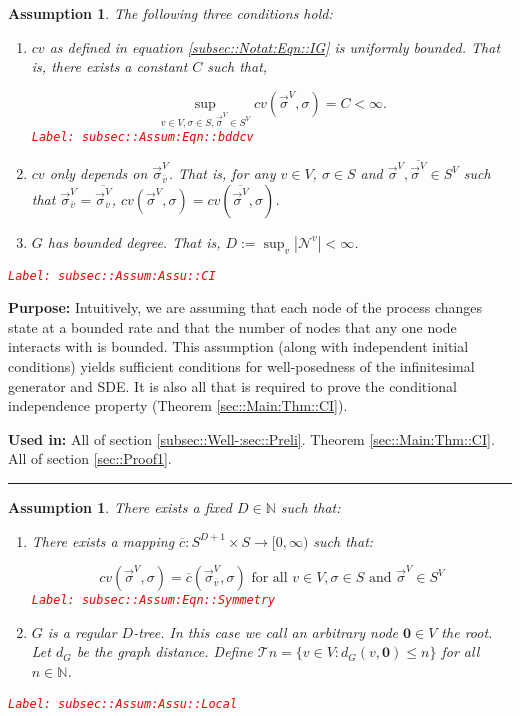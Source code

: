 \documentclass[12pt]{article}
\newcommand{\mb}{\mathbb}
\newcommand{\mc}{\mathcal}
\newcommand{\ra}{\rightarrow}
\newcommand{\ov}{\overline}
\newcommand{\te}{\text}
\newcommand{\tr}{\textcolor{red}}
\newcommand{\labe}[1]{\tr{\texttt{Label: #1}}}
\newcommand{\purpose}{\textbf{Purpose: }}
\newcommand{\usein}{\textbf{Used in: }}
\newcommand{\lin}{\rule{\linewidth}{0.4 pt}}
\newcommand{\defeq}{:=}								%
\renewcommand{\root}{\mathbf{0}}				%
\renewcommand{\v}{v}							%
\renewcommand{\S}{S}							%
\newcommand{\s}{\sigma}							%
\newcommand{\sv}{\vec{\s}}						%
\newcommand{\IGr}{c}							%
\newcommand{\neigh}{\mc{N}}						%
\newcommand{\vind}[1]{^{#1}}					%
\newcommand{\carp}[1]{^{#1}}					%
\newcommand{\vsi}[1]{^{#1}}						%
\newcommand{\cind}[1]{_{#1}}					%
\newcommand{\cl}{\ov}							%
\newcommand{\const}{C}							%
\newcommand{\degr}{D}							%
\newcommand{\IGrg}{\ov{c}}						%
\newcommand{\gdist}{d_G}						%
\newcommand{\tree}{\mc{T}}						%
\newtheorem{assu}[thms]{Assumption}
\begin{document}
\begin{assu}
The following three conditions hold:
\begin{enumerate}
\item \(\IGr{\v}\) as defined in equation \eqref{subsec::Notat:Eqn::IG} is uniformly bounded. That is, there exists a constant \(\const{}\) such that,

\begin{equation}
\sup_{\v\in V,\s \in \S,\sv\cind{}\vsi{V}\in \S\carp{V}} \IGr{\v}(\sv\cind{}\vsi{V},\s) = \const{} < \infty.
\label{subsec::Assum:Eqn::bddcv}
\end{equation}
\labe{subsec::Assum:Eqn::bddcv}

\item \(\IGr{\v}\) only depends on \(\sv\cind{\cl{\v}}\vsi{V}\). That is, for any \(\v\in V\), \(\s\in \S\) and \(\sv\cind{}\vsi{V},\ov{\sv\cind{}\vsi{V}} \in \S\carp{V}\) such that \(\sv\cind{\cl{\v}}\vsi{V} = \ov{\sv\cind{\cl{\v}}\vsi{V}}\), \(\IGr{\v}(\sv\cind{}\vsi{V},\s) = \IGr{\v}(\ov{\sv\cind{}\vsi{V}},\s)\).

\item \(G\) has bounded degree. That is, \(\degr \defeq \sup_\v |\neigh\vind{\v}| < \infty\).
\end{enumerate}
\label{subsec::Assum:Assu::CI}\labe{subsec::Assum:Assu::CI}
\end{assu}

\purpose Intuitively, we are assuming that each node of the process changes state at a bounded rate and that the number of nodes that any one node interacts with is bounded. This assumption (along with independent initial conditions) yields sufficient conditions for well-posedness of the infinitesimal generator and SDE. It is also all that is required to prove the conditional independence property (Theorem \ref{sec::Main:Thm::CI}). 

\usein All of section \ref{subsec::Well-:sec::Preli}. Theorem \ref{sec::Main:Thm::CI}. All of section \ref{sec::Proof1}.

\lin

\begin{assu}
There exists a fixed \(\degr\in \mb{N}\) such that:

\begin{enumerate}
\item There exists a mapping \(\IGrg: \S\carp{\degr+1} \times \S \ra [0,\infty)\) such that:

\begin{equation}
\IGr{\v}(\sv\cind{}\vsi{V},\s) = \IGrg(\sv\cind{\cl{\v}}\vsi{V},\s) \te{ for all } \v\in V, \s\in \S\te{ and } \sv\cind{}\vsi{V} \in \S\carp{V}
\label{subsec::Assum:Eqn::Symmetry}
\end{equation}
\labe{subsec::Assum:Eqn::Symmetry}

\item \(G\) is a regular \(\degr\)-tree. In this case we call an arbitrary node \(\root\in V\) the root. Let \(\gdist\) be the graph distance. Define \(\tree{n} = \{\v \in V: \gdist(\v,\root) \leq n\}\) for all \(n\in \mb{N}\).
\end{enumerate}
\label{subsec::Assum:Assu::Local}\labe{subsec::Assum:Assu::Local}
\end{assu}
\end{document}
